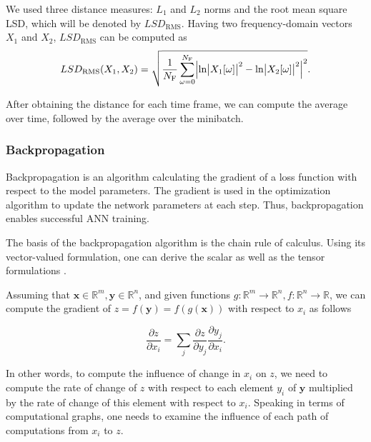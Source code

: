 We used three distance measures: $L_1$ and $L_2$ norms and the root mean square \ac{LSD}, which will be denoted by $LSD_\text{RMS}$. Having two frequency-domain vectors $X_1$ and $X_2$, $LSD_\text{RMS}$ can be computed as \cite{Gray1976}
\begin{equation}
  LSD_\text{RMS}(X_1, X_2) = \sqrt{ \frac{1}{N_\text{F}} \sum \limits_{\omega=0}^{N_\text{F}} \Bigl\lvert \ln \bigl\lvert X_1[\omega]\bigr\rvert^2 - \ln \bigl\lvert X_2[\omega]\bigr\rvert^2 \Bigr\rvert^2}.
  \label{eq:log_spectral_distance}
\end{equation}

After obtaining the distance for each time frame, we can compute the average over time, followed by the average over the minibatch.

\subsubsection{Backpropagation}
\label{sec:backpropagation}

Backpropagation is an algorithm calculating the gradient of a loss function with respect to the model parameters. The gradient is used in the optimization algorithm to update the network parameters at each step. Thus, backpropagation enables successful \ac{ANN} training.

The basis of the backpropagation algorithm is the chain rule of calculus. Using its vector-valued formulation, one can derive the scalar as well as the tensor formulations \cite{Goodfellow-et-al-2016}.

Assuming that $\pmb{x} \in \mathbb{R}^m, \pmb{y} \in \mathbb{R}^n$, and given functions $g: \mathbb{R}^m \rightarrow \mathbb{R}^n, f: \mathbb{R}^n \rightarrow \mathbb{R}$, we can compute the gradient of $z = f(\pmb{y}) = f(g(\pmb{x}))$ with respect to $x_i$ as follows

\begin{equation}
  \frac{\partial z}{\partial x_i} = \sum \limits_j \frac{\partial z}{\partial y_j} \frac{\partial y_j}{\partial x_i}.
  \label{eq:chain_rule_of_calculus}
\end{equation}

In other words, to compute the influence of change in $x_i$ on $z$, we need to compute the rate of change of $z$ with respect to each element $y_i$ of $\pmb{y}$ multiplied by the rate of change of this element with respect to $x_i$. Speaking in terms of computational graphs, one needs to examine the influence of each path of computations from $x_i$ to $z$.

